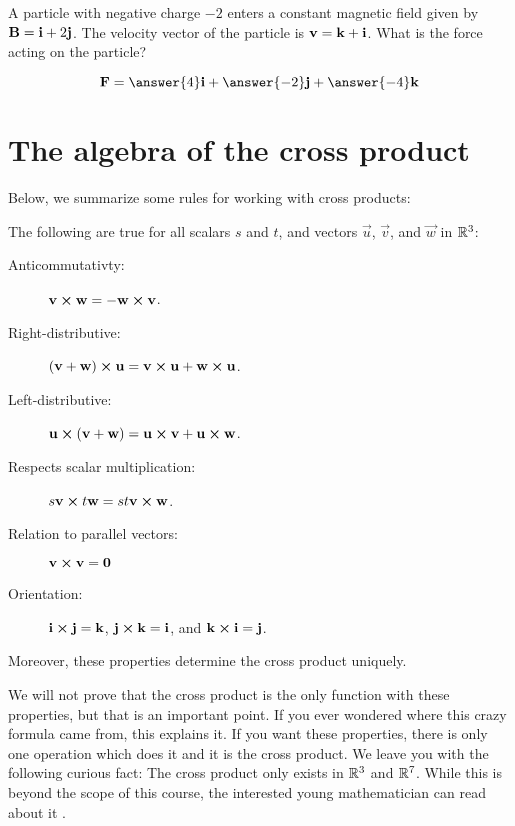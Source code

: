 \documentclass{ximera}
\begin{document}
\begin{question}
  A particle with negative charge $-2$ enters a constant magnetic
  field given by $\mathbf{B} = \mathbf{i}+2\mathbf{j}$.  The velocity vector of
  the particle is $\mathbf{v} = \mathbf{k}+\mathbf{i}$.  What is the force
  acting on the particle?
  \begin{prompt}
  \[
  \vec{F} = \answer{4}\veci+\answer{-2}\vecj+\answer{-4}\veck
  \]
  \end{prompt}
\end{question}


\section{The algebra of the cross product}


Below, we summarize some rules for working with cross products:

\begin{theorem}  The following are true for all scalars $s$ and $t$,  and vectors
  $\vec{u}$, $\vec{v}$, and $\vec{w}$ in $\mathbb R^3$:
  \begin{description}
  \item[Anticommutativty:] $\mathbf{v} \boldsymbol\times \mathbf{w}  = -\mathbf{w} \boldsymbol\times \mathbf{v}$.
  \item[Right-distributive:] $(\mathbf{v}+\mathbf{w}) \boldsymbol\times \mathbf{u} = \mathbf{v} \boldsymbol\times \mathbf{u}+\mathbf{w} \boldsymbol\times \mathbf{u}$.
  \item[Left-distributive:] $\mathbf{u} \boldsymbol\times (\mathbf{v} +\mathbf{w}) = \mathbf{u} \boldsymbol\times \mathbf{v}+\mathbf{u}\boldsymbol\times\mathbf{w}$.
  \item[Respects scalar multiplication:] $s\mathbf{v} \boldsymbol\times t\mathbf{w} = st \mathbf{v} \boldsymbol\times \mathbf{w}$.
  \item[Relation to parallel vectors:] $\mathbf{v} \boldsymbol\times \mathbf{v} = \mathbf{0}$
  \item[Orientation:] $\mathbf{i} \boldsymbol\times \mathbf{j} = \mathbf{k}$, $\mathbf{j} \boldsymbol\times \mathbf{k} = \mathbf{i}$, and $\mathbf{k} \boldsymbol\times \mathbf{i} = \mathbf{j}$. 
  \end{description}
  Moreover, these properties determine the cross product uniquely.
\end{theorem}

We will not prove that the cross product is the only function with
these properties, but that is an important point.  If you ever
wondered where this crazy formula came from, this explains it.  If you
want these properties, there is only one operation which does it and
it is the cross product. We leave you with the following curious fact:
The cross product only exists in $\mathbb R^3$ and $\mathbb R^7$. While this is
beyond the scope of this course, the interested young mathematician can read about it .
\end{document}

